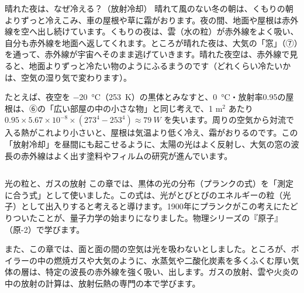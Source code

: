 \begin{column}{晴れた夜は、なぜ冷える？（放射冷却）}
晴れて風のない冬の朝は、くもりの朝よりずっと冷えこみ、車の屋根や草に霜がおります。夜の間、地面や屋根は赤外線を空へ出し続けています。くもりの夜は、雲（水の粒）が赤外線をよく吸い、自分も赤外線を地面へ返してくれます。ところが晴れた夜は、大気の「窓」（⑦）を通って、赤外線が宇宙へそのまま逃げていきます。晴れた夜空は、赤外線で見ると、地面よりずっと冷たい物のようにふるまうのです（どれくらい冷たいかは、空気の湿り気で変わります）。

たとえば、夜空を \qty{-20}{\celsius}（\qty{253}{K}）の黒体とみなすと、\qty{0}{\celsius}・放射率0.95の屋根は、⑥の「広い部屋の中の小さな物」と同じ考えで、1 m$^2$ あたり $0.95\times5.67\times10^{-8}\times(273^4-253^4)\approx\qty{79}{W}$ を失います。周りの空気から対流で入る熱がこれより小さいと、屋根は気温より低く冷え、霜がおりるのです。この「放射冷却」を昼間にも起こせるように、太陽の光はよく反射し、大気の窓の波長の赤外線はよく出す塗料やフィルムの研究が進んでいます。
\end{column}

\begin{phsaki}{光の粒と、ガスの放射}
この章では、黒体の光の分布（プランクの式）を「測定に合う式」として使いました。この式は、光がとびとびのエネルギーの粒（光子）として出入りすると考えると導けます。1900年にプランクがこの考えにたどりついたことが、量子力学の始まりになりました。物理シリーズの『原子』（原-2）で学びます。

また、この章では、面と面の間の空気は光を吸わないとしました。ところが、ボイラーの中の燃焼ガスや大気のように、水蒸気や二酸化炭素を多くふくむ厚い気体の層は、特定の波長の赤外線を強く吸い、出します。ガスの放射、雲や火炎の中の放射の計算は、放射伝熱の専門の本で学びます。
\end{phsaki}

